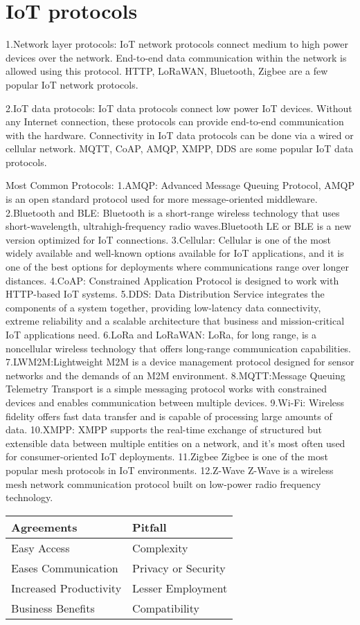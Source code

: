  \section{IoT protocols}
  \begin{IoT protocols}
1.Network layer protocols: IoT network protocols connect medium to high power devices over the network. End-to-end data communication within the network is allowed using this protocol. HTTP, LoRaWAN, Bluetooth, Zigbee are a few popular IoT network protocols.\hfill \break

2.IoT data protocols: IoT data protocols connect low power IoT devices. Without any Internet connection, these protocols can provide end-to-end communication with the hardware. Connectivity in IoT data protocols can be done via a wired or cellular network. MQTT, CoAP, AMQP, XMPP, DDS are some popular IoT data protocols.

Most Common Protocols:\hfill \break
1.AMQP:
Advanced Message Queuing Protocol, AMQP is an open standard protocol used for more message-oriented middleware.\hfill \break
2.Bluetooth and BLE:
Bluetooth is a short-range wireless technology that uses short-wavelength, ultrahigh-frequency radio waves.Bluetooth LE or BLE is a new version optimized for IoT connections.\hfill \break
3.Cellular:
Cellular is one of the most widely available and well-known options available for IoT applications, and it is one of the best options for deployments where communications range over longer distances.\hfill \break
4.CoAP:
Constrained Application Protocol is designed to work with HTTP-based IoT systems.\hfill \break
5.DDS:
Data Distribution Service integrates the components of a system together, providing low-latency data connectivity, extreme reliability and a scalable architecture that business and mission-critical IoT applications need.\hfill \break
6.LoRa and LoRaWAN:
LoRa, for long range, is a noncellular wireless technology that offers long-range communication capabilities.\hfill \break
7.LWM2M:Lightweight M2M is a device management protocol designed for sensor networks and the demands of an M2M environment.\hfill \break
8.MQTT:Message Queuing Telemetry Transport is a simple messaging protocol works with constrained devices and enables communication between multiple devices.\hfill \break
9.Wi-Fi:
Wireless fidelity offers fast data transfer and is capable of processing large amounts of data.\hfill \break
10.XMPP:
XMPP supports the real-time exchange of structured but extensible data between multiple entities on a network, and it's most often used for consumer-oriented IoT deployments.\hfill \break
11.Zigbee
Zigbee is one of the most popular mesh protocols in IoT environments.\hfill \break
12.Z-Wave
Z-Wave is a wireless mesh network communication protocol built on low-power radio frequency technology.
  \end{IoT protocols}

\begin{tabular}{ |p{3cm}|p{3cm}| }
\hline
Agreements & Pitfall\\
\hline
Easy Access & Complexity \\
Eases Communication & Privacy or Security \\
Increased Productivity & Lesser Employment \\
Business Benefits & Compatibility \\

\hline
\end{tabular}
  

